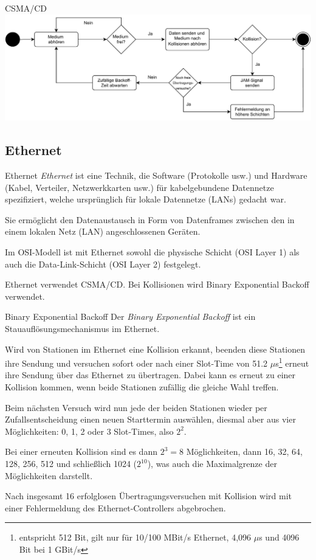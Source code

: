 \begin{diag}{CSMA/CD}
    \centering
    \includegraphics[width=\textwidth]{includes/figures/defi_csmacd.pdf}
\end{diag}

\subsection{Ethernet}

\begin{defi}{Ethernet}
    \emph{Ethernet} ist eine Technik, die Software (Protokolle usw.) und Hardware (Kabel, Verteiler, Netzwerkkarten usw.) für kabelgebundene Datennetze spezifiziert, welche ursprünglich für lokale Datennetze (LANs) gedacht war.

    Sie ermöglicht den Datenaustausch in Form von Datenframes zwischen den in einem lokalen Netz (LAN) angeschlossenen Geräten.

    Im OSI-Modell ist mit Ethernet sowohl die physische Schicht (OSI Layer 1) als auch die Data-Link-Schicht (OSI Layer 2) festgelegt.

    Ethernet verwendet CSMA/CD.
    Bei Kollisionen wird Binary Exponential Backoff verwendet.
\end{defi}

\begin{defi}{Binary Exponential Backoff}
    Der \emph{Binary Exponential Backoff} ist ein Stauauflösungsmechanismus im Ethernet.

    Wird von Stationen im Ethernet eine Kollision erkannt, beenden diese Stationen ihre Sendung und versuchen sofort oder nach einer Slot-Time von 51.2 $\mu$s\footnote{entspricht 512 Bit, gilt nur für 10/100 MBit/s Ethernet, 4,096 $\mu$s und 4096 Bit bei 1 GBit/s} erneut ihre Sendung über das Ethernet zu übertragen.
    Dabei kann es erneut zu einer Kollision kommen, wenn beide Stationen zufällig die gleiche Wahl treffen.

    Beim nächsten Versuch wird nun jede der beiden Stationen wieder per Zufallsentscheidung einen neuen Starttermin auswählen, diesmal aber aus vier Möglichkeiten: 0, 1, 2 oder 3 Slot-Times, also $2^2$.

    Bei einer erneuten Kollision sind es dann $2^3 = 8$ Möglichkeiten, dann 16, 32, 64, 128, 256, 512 und schließlich 1024 ($2^{10}$), was auch die Maximalgrenze der Möglichkeiten darstellt.

    Nach insgesamt 16 erfolglosen Übertragungsversuchen mit Kollision wird mit einer Fehlermeldung des Ethernet-Controllers abgebrochen.
\end{defi}

